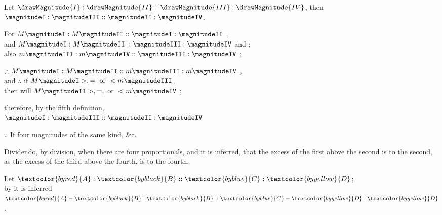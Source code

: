 \vfill\pagebreak

\label{prop:V.XVI}

\begin{center}
Let $\drawMagnitude{I} : \drawMagnitude{II} :: \drawMagnitude{III} : \drawMagnitude{IV}$, then $\magnitudeI : \magnitudeIII :: \magnitudeII : \magnitudeIV$.

For $M \magnitudeI : M \magnitudeII :: \magnitudeI : \magnitudeII$ ,\\
and $M \magnitudeI : M \magnitudeII :: \magnitudeIII : \magnitudeIV$ \bycref{\hypref} and ;\\
also $m \magnitudeIII : m \magnitudeIV :: \magnitudeIII : \magnitudeIV$ ;

$\therefore M \magnitudeI : M \magnitudeII :: m \magnitudeIII : m \magnitudeIV$ ,\\
and $\therefore$ if $M \magnitudeI >, = \mbox { or } < m \magnitudeIII$,\\
then will $M \magnitudeII >, =, \mbox{ or } < m \magnitudeIV$ ;

therefore, by the fifth definition,\\
 $\magnitudeI : \magnitudeIII :: \magnitudeII : \magnitudeIV$

 $\therefore$ If four magnitudes of the same kind, \&c.
\end{center}


\vfill\pagebreak

\label{def:V.XVI} 
\def\varA{\textcolor{byred}{A}}
\def\varB{\textcolor{byblack}{B}}
\def\varC{\textcolor{byblue}{C}}
\def\varD{\textcolor{byyellow}{D}}
Dividendo, by division, when there are four proportionals, and it is inferred, that the excess of the first above the second is to the second, as the excess of the third above the fourth, is to the fourth.

\begin{center}
Let $\varA : \varB :: \varC : \varD$;\\
by  it is inferred\\
$\varA - \varB : \varB :: \varC - \varD : \varD$. %
\end{center}

